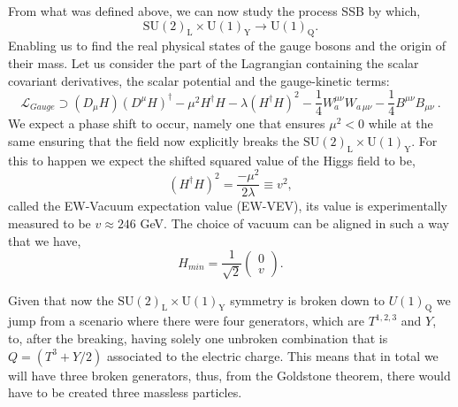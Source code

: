 \documentclass[10pt]{book}
\newcommand{\U}[1]{\mathrm{U}(1)_{\mathrm{#1}}}
\newcommand{\SU}[1]{\mathrm{SU}(2)_{\mathrm{#1}}}
\renewcommand{\(}{\left(}
\renewcommand{\)}{\right)}
\renewcommand{\[}{\left[}
\renewcommand{\]}{\right]}
\begin{document}
From what was defined above, we can now study the process SSB by which, 
%
\begin{equation}
\SU{L}\times\U{Y} \rightarrow \U{Q}. 
\end{equation} 
%
Enabling us to find the real physical states of the gauge bosons and the origin of their mass. Let us consider the part of the Lagrangian containing the scalar covariant derivatives, the scalar potential and the gauge-kinetic terms:
%
\begin{equation}
\mathcal{L}_{Gauge} \supset (D_\mu H)(D^\mu H)^\dagger - \mu^2 H^\dagger H - \lambda (H^\dagger H)^2 - \frac{1}{4}  W^{\mu \nu}_a W_{a \,\mu \nu}  
- \frac{1}{4}  B^{\mu \nu} B_{\mu \nu} \ . 
\label{eq:GaugeSM}
\end{equation} 
% 
We expect a phase shift to occur, namely one that ensures $\mu^2 < 0$ while at the same ensuring that the field now explicitly breaks the $\mathrm{SU(2)_L \times U(1)_Y}$. For this to happen we expect the shifted squared value of the Higgs field to be,
%
\begin{equation}
(H^\dagger H)^2 = \frac{-\mu^2}{2\lambda} \equiv  v^2  , 
\end{equation} 
called the EW-Vacuum expectation value (EW-VEV), its value is experimentally measured to be $v \approx 246$ GeV. 
%
The choice of vacuum can be aligned in such a way that we have,
\begin{equation}
H_{min} = \frac{1}{\sqrt{2}} \begin{pmatrix} 0 \\
v 
\end{pmatrix}  .
\end{equation}

Given that now the $\mathrm{SU}(2)_{\mathrm{L}} \times \mathrm{U}(1)_{\mathrm{Y}}$ symmetry is broken down to $U(1)_{\mathrm{Q}}$ we jump from a scenario where there were four generators, which are $T^{1,2,3}$ and $Y$, to, after the breaking, having solely one unbroken combination that is $Q =  (T^3 + Y/2)$ associated to the electric charge.
%
This means that in total we will have three broken generators, thus, from the Goldstone theorem, there would have to be created three massless particles. %
\end{document}
